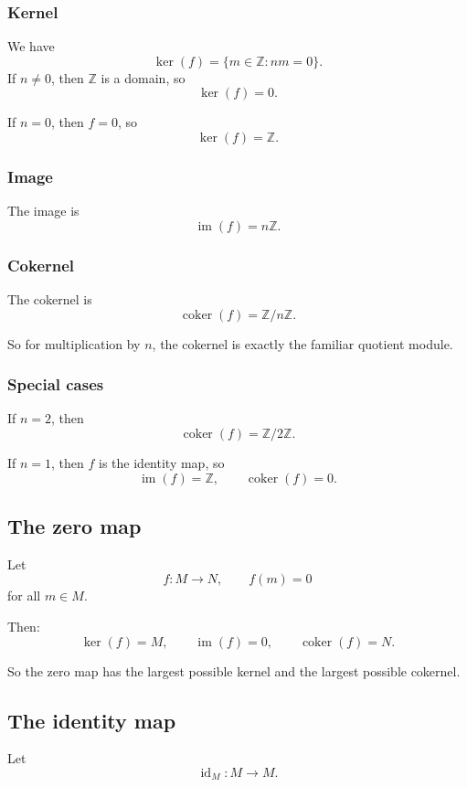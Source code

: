 \documentclass[12pt,a4paper]{article}
\theoremstyle{notespace}
\theoremstyle{definition}
\begin{document}
\subsubsection*{Kernel}

We have
\[
\ker(f)=\{m\in\mathbb Z:nm=0\}.
\]
If \(n\neq 0\), then \(\mathbb Z\) is a domain, so
\[
\ker(f)=0.
\]

If \(n=0\), then \(f=0\), so
\[
\ker(f)=\mathbb Z.
\]

\subsubsection*{Image}

The image is
\[
\operatorname{im}(f)=n\mathbb Z.
\]

\subsubsection*{Cokernel}

The cokernel is
\[
\operatorname{coker}(f)=\mathbb Z/n\mathbb Z.
\]

So for multiplication by \(n\), the cokernel is exactly the familiar quotient module.

\subsubsection*{Special cases}

If \(n=2\), then
\[
\operatorname{coker}(f)=\mathbb Z/2\mathbb Z.
\]

If \(n=1\), then \(f\) is the identity map, so
\[
\operatorname{im}(f)=\mathbb Z,
\qquad
\operatorname{coker}(f)=0.
\]

\subsection{ The zero map}

Let
\[
f:M\longrightarrow N,
\qquad
f(m)=0
\]
for all \(m\in M\).

Then:
\[
\ker(f)=M,
\qquad
\operatorname{im}(f)=0,
\qquad
\operatorname{coker}(f)=N.
\]

So the zero map has the largest possible kernel and the largest possible cokernel.

\subsection{ The identity map}

Let
\[
\operatorname{id}_M:M\to M.
\]
\end{document}
